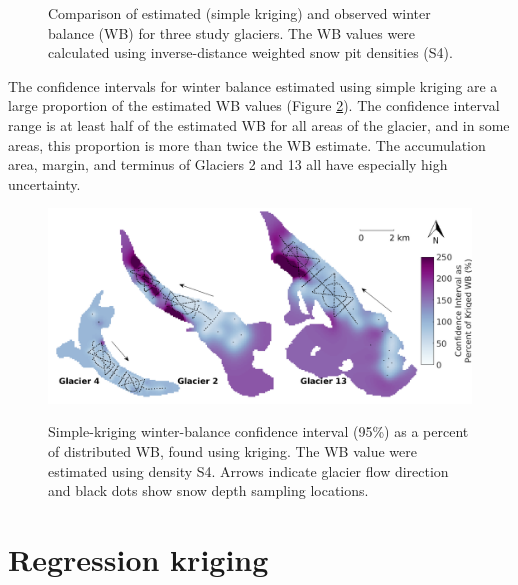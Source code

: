 \documentclass{sfuthesis}
\newcommand{\topomap}{Arrows indicate glacier flow direction and black dots show snow depth sampling locations. }
\begin{document}
\begin{figure}
	\caption{Comparison of estimated (simple kriging) and observed winter balance (WB) for three study glaciers. The WB values were calculated using inverse-distance weighted snow pit densities (S4).}
	\label{fig:R2simplekrig}
\end{figure}

The confidence intervals for winter balance estimated using simple kriging are a large proportion of the estimated WB values (Figure \ref{fig:krigingCI_percent}). The confidence interval range is at least half of the estimated WB for all areas of the glacier, and in some areas, this proportion is more than twice the WB estimate. The accumulation area, margin, and terminus of Glaciers 2 and 13 all have especially high uncertainty. 

\begin{figure}[H]
	\centering
	\includegraphics[width = \textwidth]{KrigingCI_percent.png}\\
	\caption{Simple-kriging winter-balance confidence interval (95\%) as a percent of distributed WB, found using kriging. The WB value were estimated using density S4. \topomap}
	\label{fig:krigingCI_percent}
\end{figure}

\section{Regression kriging}
\label{sec:regressionkriging}
\end{document}
